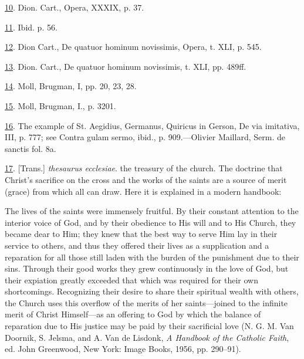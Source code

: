 \protect\hypertarget{23_NOTES.xhtmlux5cux23id_717}{\protect\hyperlink{17_Chapter_Ten__THE_FAILURE_OF_IMAG.xhtmlux5cux23id_716}{10}}.
Dion. Cart., Opera, XXXIX, p. 37.

\protect\hypertarget{23_NOTES.xhtmlux5cux23id_715}{\protect\hyperlink{17_Chapter_Ten__THE_FAILURE_OF_IMAG.xhtmlux5cux23id_714}{11}}.
Ibid. p. 56.

\protect\hypertarget{23_NOTES.xhtmlux5cux23id_713}{\protect\hyperlink{17_Chapter_Ten__THE_FAILURE_OF_IMAG.xhtmlux5cux23id_712}{12}}.
Dion Cart., De quatuor hominum novissimis, Opera, t. XLI, p. 545.

\protect\hypertarget{23_NOTES.xhtmlux5cux23id_711}{\protect\hyperlink{17_Chapter_Ten__THE_FAILURE_OF_IMAG.xhtmlux5cux23id_710}{13}}.
Dion. Cart., De quatuor hominum novissimis, t. XLI, pp. 489ff.

\protect\hypertarget{23_NOTES.xhtmlux5cux23id_709}{\protect\hyperlink{17_Chapter_Ten__THE_FAILURE_OF_IMAG.xhtmlux5cux23id_708}{14}}.
Moll, Brugman, I, pp. 20, 23, 28.

\protect\hypertarget{23_NOTES.xhtmlux5cux23id_707}{\protect\hyperlink{17_Chapter_Ten__THE_FAILURE_OF_IMAG.xhtmlux5cux23id_706}{15}}.
Moll, Brugman, I., p. 3201.

\protect\hypertarget{23_NOTES.xhtmlux5cux23id_705}{\protect\hyperlink{17_Chapter_Ten__THE_FAILURE_OF_IMAG.xhtmlux5cux23id_704}{16}}.
The example of St. Aegidius, Germanus, Quiricus in Gerson, De via
imitativa, III, p. 777; see Contra gulam sermo, ibid., p. 909.---Olivier
Maillard, Serm. de sanctis fol. 8a.

\protect\hypertarget{23_NOTES.xhtmlux5cux23id_703}{\protect\hyperlink{17_Chapter_Ten__THE_FAILURE_OF_IMAG.xhtmlux5cux23id_702}{17}}.
{[}Trans.{]} \emph{thesaurus ecclesiae}. the treasury of the church. The
doctrine that Christ's sacrifice on the cross and the works of the
saints are a source of merit (grace) from which all can draw. Here it is
explained in a modern handbook:

\protect\hypertarget{23_NOTES.xhtmlux5cux23page_427}{}{}The lives of the
saints were immensely fruitful. By their constant attention to the
interior voice of God, and by their obedience to His will and to His
Church, they became dear to Him; they knew that the best way to serve
Him lay in their service to others, and thus they offered their lives as
a supplication and a reparation for all those still laden with the
burden of the punishment due to their sins. Through their good works
they grew continuously in the love of God, but their expiation greatly
exceeded that which was required for their own shortcomings. Recognizing
their desire to share their spiritual wealth with others, the Church
uses this overflow of the merits of her saints---joined to the infinite
merit of Christ Himself---as an offering to God by which the balance of
reparation due to His justice may be paid by their sacrificial love (N.
G. M. Van Doornik, S. Jelsma, and A. Van de Lisdonk, \emph{A Handbook of
the Catholic Faith}, ed. John Greenwood, New York: Image Books, 1956,
pp. 290--91).

